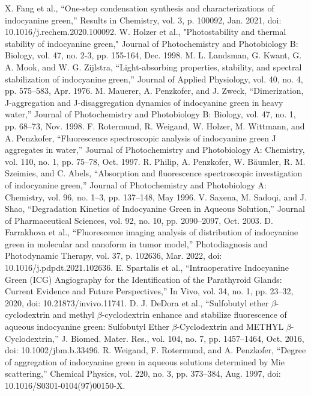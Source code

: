 \begin{thebibliography}{99}
 X. Fang et al., “One-step condensation synthesis and characterizations of indocyanine green,” Results in Chemistry, vol. 3, p. 100092, Jan. 2021, doi: 10.1016/j.rechem.2020.100092.
W. Holzer et al., "Photostability and thermal stability of indocyanine green," Journal of Photochemistry and Photobiology B: Biology,  vol. 47, no. 2-3, pp. 155-164, Dec. 1998.
M. L. Landsman, G. Kwant, G. A. Mook, and W. G. Zijlstra, “Light-absorbing properties, stability, and spectral stabilization of indocyanine green,” Journal of Applied Physiology, vol. 40, no. 4, pp. 575–583, Apr. 1976.
M. Mauerer, A. Penzkofer, and J. Zweck, “Dimerization, J-aggregation and J-disaggregation dynamics of indocyanine green in heavy water,” Journal of Photochemistry and Photobiology B: Biology, vol. 47, no. 1, pp. 68–73, Nov. 1998.
F. Rotermund, R. Weigand, W. Holzer, M. Wittmann, and A. Penzkofer, “Fluorescence spectroscopic analysis of indocyanine green J aggregates in water,” Journal of Photochemistry and Photobiology A: Chemistry, vol. 110, no. 1, pp. 75–78, Oct. 1997.
R. Philip, A. Penzkofer, W. Bäumler, R. M. Szeimies, and C. Abels, “Absorption and fluorescence spectroscopic investigation of indocyanine green,” Journal of Photochemistry and Photobiology A: Chemistry, vol. 96, no. 1–3, pp. 137–148, May 1996.
V. Saxena, M. Sadoqi, and J. Shao, “Degradation Kinetics of Indocyanine Green in Aqueous Solution,” Journal of Pharmaceutical Sciences, vol. 92, no. 10, pp. 2090–2097, Oct. 2003. 
D. Farrakhova et al., “Fluorescence imaging analysis of distribution of indocyanine green in molecular and nanoform in tumor model,” Photodiagnosis and Photodynamic Therapy, vol. 37, p. 102636, Mar. 2022, doi: 10.1016/j.pdpdt.2021.102636.
 E. Spartalis et al., “Intraoperative Indocyanine Green (ICG) Angiography for the Identification of the Parathyroid Glands: Current Evidence and Future Perspectives,” In Vivo, vol. 34, no. 1, pp. 23–32, 2020, doi: 10.21873/invivo.11741.
D. J. DeDora et al., “Sulfobutyl ether $\beta$-cyclodextrin and methyl $\beta$-cyclodextrin enhance and stabilize fluorescence of aqueous indocyanine green: Sulfobutyl Ether $\beta$-Cyclodextrin and METHYL $\beta$-Cyclodextrin,” J. Biomed. Mater. Res., vol. 104, no. 7, pp. 1457–1464, Oct. 2016, doi: 10.1002/jbm.b.33496.
R. Weigand, F. Rotermund, and A. Penzkofer, “Degree of aggregation of indocyanine green in aqueous solutions determined by Mie scattering,” Chemical Physics, vol. 220, no. 3, pp. 373–384, Aug. 1997, doi: 10.1016/S0301-0104(97)00150-X.

\end{thebibliography}
